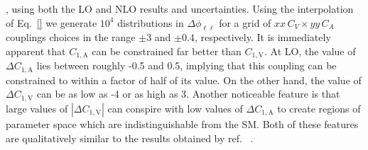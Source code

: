 \documentclass[preprint]{JHEP3} %
\def\ConeA{C_{1,\mathrm{A}}}
\def\ConeV{C_{1,\mathrm{V}}}
\def\DConeA{\Delta C_{1,\mathrm{A}}}
\def\DConeV{\Delta C_{1,\mathrm{V}}}
\begin{document}
, using both the LO and NLO results and uncertainties.
Using the interpolation of Eq.~\ref{} we generate $10^4$ distributions in $\Delta \phi_{\ell\ell}$ for a grid of $xx \, C_V \times yy\, C_A$ couplings 
choices in the range $\pm 3$ and $\pm 0.4$, respectively. 
It is immediately apparent that $\ConeA$ can be constrained far better than $\ConeV$. 
At LO, the value of $\DConeA$ lies between roughly -0.5 and 0.5, implying that this coupling can be constrained to within a factor of half of its value. 
On the other hand, the value of $\DConeV$ can be as low as -4 or as high as 3. Another noticeable feature is that large values of $| \DConeV |$ can conspire 
with low values of $\DConeA$ to create regions of parameter space which are indistinguishable from the SM. 
Both of these features are qualitatively similar to the results obtained by ref. ~\cite{baur}. 
\end{document}
